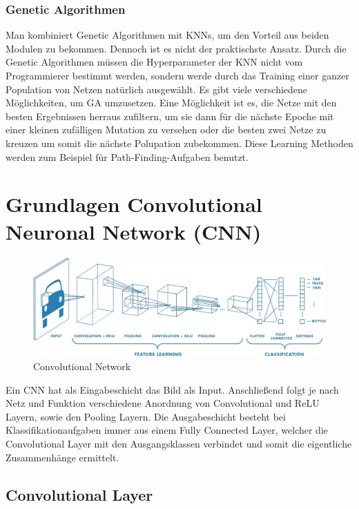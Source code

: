 \subsubsection{Genetic Algorithmen}
Man kombiniert Genetic Algorithmen mit KNNs, um den Vorteil aus beiden Modulen zu bekommen. Dennoch ist es nicht der praktischste Ansatz. Durch die Genetic Algorithmen müssen die Hyperparameter der KNN nicht vom Programmierer bestimmt werden, sondern werde durch das Training einer ganzer Population von Netzen natürlich ausgewählt. Es gibt viele verschiedene Möglichkeiten, um GA umzusetzen. Eine Möglichkeit ist es, die Netze mit den besten Ergebnissen herraus zufiltern, um sie dann für die nächste Epoche mit einer kleinen zufälligen Mutation zu versehen oder die besten zwei Netze zu kreuzen um somit die nächste Polupation zubekommen. Diese Learning Methoden werden zum Beispiel für Path-Finding-Aufgaben benutzt.

\section{Grundlagen Convolutional Neuronal Network (CNN)}

\begin{figure}[htb]
  \centering  
  \includegraphics[scale=0.25]{img/Convolutional_Net_Skizze.png}
  \caption{Convolutional Network \cite{Convolutional_Net_Skizze}}
  \label{fig:Convolutional_Net_Skizze}
\end{figure}

Ein \acl{CNN} hat als Eingabeschicht das Bild als Input. Anschließend folgt je nach Netz und Funktion verschiedene Anordnung von Convolutional und ReLU Layern, sowie den Pooling Layern. Die
Ausgabeschicht besteht bei Klassifikationaufgaben immer aus einem Fully Connected Layer, welcher die Convolutional Layer mit den Ausgangsklassen verbindet und somit die eigentliche Zusammenhänge ermittelt.

\subsection{Convolutional Layer}

